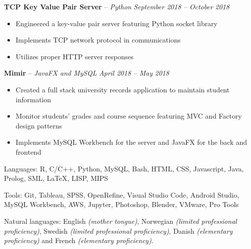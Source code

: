 \documentclass[11pt,letterpaper]{article}
\begin{document}
										
\headedsection 
{\textbf{TCP Key Value Pair Server} -- \textit{Python}}
{\textit{September 2018 -- October 2018}} {
	\begin{itemize}[noitemsep,nolistsep]
		\item Engineered a key-value pair server featuring Python socket library
		\item Implements TCP network protocol in communications	
		\item Utilizes proper HTTP server responses
	\end{itemize}
}	
					
										
\headedsection 
{\textbf{Mimir} -- \textit{JavaFX and MySQL}}
{\textit{April 2018 -- May 2018}} {
	\begin{itemize}[noitemsep,nolistsep]
		\item Created a full stack university records application to maintain student information
		\item Monitor students' grades and course sequence featuring MVC and Factory design patterns
		\item Implements MySQL Workbench for the server and JavaFX for the back and frontend
	\end{itemize}
}
										
										
										
\spacedhrule{0.2em}{-0.8em} 
										
										
										
										
										
\inlineheadsection 
{Languages:}
{R, C/C++, Python, MySQL, Bash, HTML, CSS, Javascript, Java, Prolog, SML, {\LaTeX}, LISP, MIPS}
										
										
\inlineheadsection 
{Tools:}
{Git, Tableau, SPSS, OpenRefine, Visual Studio Code, Android Studio, MySQL Workbench, AWS, Jupyter, Photoshop, Blender, VMware, Pro Tools}
										
										
\inlineheadsection 
{Natural languages:}
{English \textit{(mother tongue)}, Norwegian \textit{(limited professional proficiency)}, Swedish \textit{(limited professional proficiency)}, Danish \textit{(elementary proficiency)} and French \textit{(elementary proficiency)}.}
										
										
\end{document}
